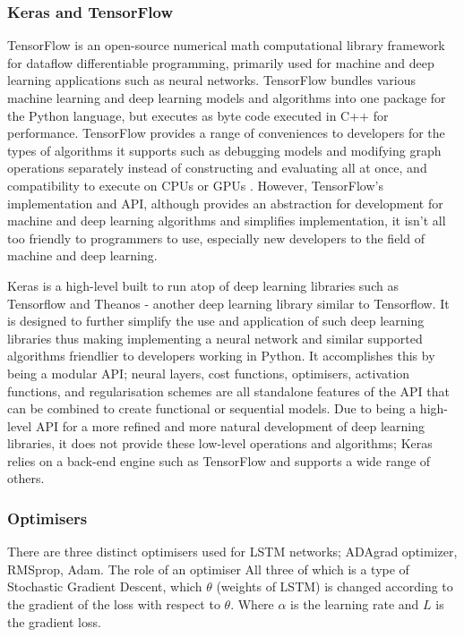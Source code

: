 \documentclass[oneside, 12pt]{article}
\begin{document}
			\subsubsection{Keras and TensorFlow}
			TensorFlow is an open-source numerical math computational library framework for dataflow differentiable programming, primarily used for machine and deep learning applications such as neural networks. TensorFlow bundles various machine learning and deep learning models and algorithms into one package for the Python language, but executes as byte code executed in C++ for performance. TensorFlow provides a range of conveniences to developers for the types of algorithms it supports such as debugging models and modifying graph operations separately instead of constructing and evaluating all at once, and compatibility to execute on CPUs or GPUs \cite{TensorFlow}. However, TensorFlow's implementation and API, although provides an abstraction for development for machine and deep learning algorithms and simplifies implementation, it isn't all too friendly to programmers to use, especially new developers to the field of machine and deep learning.
			
			Keras is a high-level built to run atop of deep learning libraries such as Tensorflow and Theanos - another deep learning library similar to Tensorflow. It is designed to further simplify the use and application of such deep learning libraries thus making implementing a neural network and similar supported algorithms friendlier to developers working in Python. It accomplishes this by being a modular API; neural layers, cost functions, optimisers, activation functions, and regularisation schemes are all standalone features of the API that can be combined to create functional or sequential models. Due to being a high-level API for a more refined and more natural development of deep learning libraries, it does not provide these low-level operations and algorithms; Keras relies on a back-end engine such as TensorFlow and supports a wide range of others.
			
			\subsubsection{Optimisers}
			There are three distinct optimisers used for LSTM networks; ADAgrad optimizer, RMSprop, Adam. The role of an optimiser
			All three of which is a type of Stochastic Gradient Descent, which $\theta$ (weights of LSTM) is changed according to the gradient of the loss with respect to $\theta$. Where $\alpha$ is the learning rate and $L$ is the gradient loss. \cite{OptSGD}
			
\end{document}
